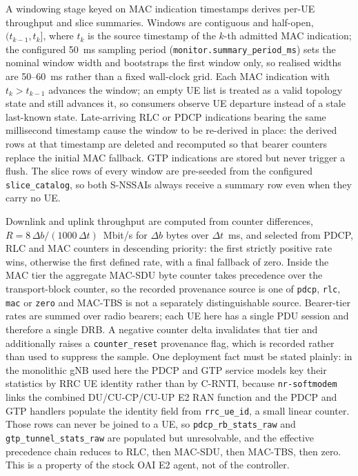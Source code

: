 A windowing stage keyed on MAC indication timestamps derives per-UE throughput and slice summaries. Windows are contiguous and half-open, $(t_{k-1},t_k]$, where $t_k$ is the source timestamp of the $k$-th admitted MAC indication; the configured 50~ms sampling period (\texttt{monitor.summary\_period\_ms}) sets the nominal window width and bootstraps the first window only, so realised widths are 50--60~ms rather than a fixed wall-clock grid. Each MAC indication with $t_k>t_{k-1}$ advances the window; an empty UE list is treated as a valid topology state and still advances it, so consumers observe UE departure instead of a stale last-known state. Late-arriving RLC or PDCP indications bearing the same millisecond timestamp cause the window to be re-derived in place: the derived rows at that timestamp are deleted and recomputed so that bearer counters replace the initial MAC fallback. GTP indications are stored but never trigger a flush. The slice rows of every window are pre-seeded from the configured \texttt{slice\_catalog}, so both S-NSSAIs always receive a summary row even when they carry no UE.

Downlink and uplink throughput are computed from counter differences, $R = 8\,\Delta b / (1000\,\Delta t)$~Mbit/s for $\Delta b$ bytes over $\Delta t$~ms, and selected from PDCP, RLC and MAC counters in descending priority: the first strictly positive rate wins, otherwise the first defined rate, with a final fallback of zero. Inside the MAC tier the aggregate MAC-SDU byte counter takes precedence over the transport-block counter, so the recorded provenance source is one of \texttt{pdcp}, \texttt{rlc}, \texttt{mac} or \texttt{zero} and MAC-TBS is not a separately distinguishable source. Bearer-tier rates are summed over radio bearers; each UE here has a single PDU session and therefore a single DRB. A negative counter delta invalidates that tier and additionally raises a \texttt{counter\_reset} provenance flag, which is recorded rather than used to suppress the sample. One deployment fact must be stated plainly: in the monolithic gNB used here the PDCP and GTP service models key their statistics by RRC UE identity rather than by C-RNTI, because \texttt{nr-softmodem} links the combined DU/CU-CP/CU-UP E2 RAN function and the PDCP and GTP handlers populate the identity field from \texttt{rrc\_ue\_id}, a small linear counter. Those rows can never be joined to a UE, so \texttt{pdcp\_rb\_stats\_raw} and \texttt{gtp\_tunnel\_stats\_raw} are populated but unresolvable, and the effective precedence chain reduces to RLC, then MAC-SDU, then MAC-TBS, then zero. This is a property of the stock OAI E2 agent, not of the controller.

